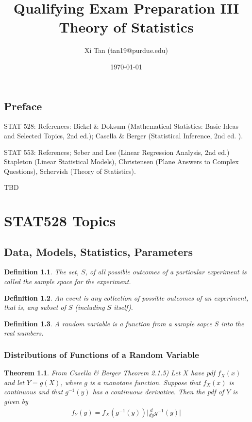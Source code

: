 \documentclass{report}
\title{Qualifying Exam Preparation III \\Theory of Statistics}
\author{Xi Tan (tan19@purdue.edu)}
\date{\today}
\newtheorem{definition}{Definition}[section]
\newtheorem{theorem}{Theorem}[section]
\begin{document}
\maketitle
\tableofcontents
\newpage

\chapter*{Preface}
STAT 528:  References: Bickel \& Doksum (Mathematical Statistics: Basic Ideas and Selected Topics, 2nd ed.); Casella \& Berger (Statistical Inference, 2nd ed. ).

STAT 553:   References; Seber and Lee (Linear Regression Analysis, 2nd ed.) Stapleton (Linear Statistical Models), Christensen (Plane Answers to Complex Questions),  Schervish (Theory of Statistics). 

TBD

\part{STAT528 Topics}
\chapter{Data, Models, Statistics, Parameters}
\begin{definition}
	The set, $S$, of all possible outcomes of a particular experiment is called the sample space for the experiment.
\end{definition}
\begin{definition}
	An event is any collection of possible outcomes of an experiment, that is, any subset of $S$ (including $S$ itself).
\end{definition}
\begin{definition}
	A random variable is a function from a sample sapce $S$ into the real numbers.
\end{definition}


\section{Distributions of Functions of a Random Variable}
\begin{theorem}
	From Casella \& Berger Theorem 2.1.5) Let $X$ have pdf $f_X(x)$ and let $Y=g(X)$, where $g$ is a monotone function. Suppose that $f_X(x)$ is continuous and that $g^{-1}(y)$ has a continuous derivative. Then the pdf of $Y$ is given by
	\begin{align}
		f_Y(y) = f_X(g^{-1}(y)) \Big|\frac{d}{dy} g^{-1}(y)\Big|
	\end{align}
\end{theorem}
\end{document}
